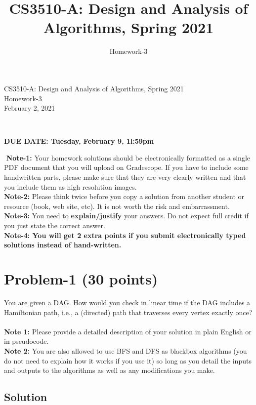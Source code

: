 \documentclass[11pt]{article}
\title{CS3510-A: Design and Analysis of Algorithms, Spring 2021}
\author{Homework-3}
\begin{document}
\begin{center}
    
    \LARGE CS3510-A: Design and Analysis of Algorithms, Spring 2021 \\ \vspace{1em} 
    \large Homework-3 \\ \vspace{0.5em}
    February 2, 2021
\end{center}
\thispagestyle{empty}
\pagestyle{empty}
​
\noindent
\begin{center}
{\bf DUE DATE: Tuesday, February 9, 1l:59pm}
\end{center}
​
\noindent
{\bf Note-1:} Your homework solutions should be electronically formatted as a single PDF document that you will upload on Gradescope. 
If you have to include some handwritten parts, please make sure that they are very clearly written and that you include them as high resolution images. \\
​
\noindent
{\bf Note-2:} Please think twice before you copy a solution from another student or resource (book, web site, etc). 
It is not worth the risk and embarrassment. \\
​
\noindent
{\bf Note-3:} You need to {\bf explain/justify} your answers. Do not expect full credit if you just state the correct answer. \\
​
\noindent
{\bf Note-4: You will get 2 extra points if you submit electronically typed solutions instead of hand-written.} 
​
\newpage
\section*{Problem-1 (30 points)}
You are given a DAG. How would you check in linear time if the DAG includes a Hamiltonian path, i.e., a (directed) path that traverses every vertex exactly once? \\ \\\textbf{Note 1:} Please provide a detailed description of your solution in plain English or in pseudocode. \\
\textbf{Note 2:} You are also allowed to use BFS and DFS as blackbox algorithms (you do not need to explain how it works if you use it) so long as you detail the inputs and outputs to the algorithms as well as any modifications you make.​


\subsection*{Solution}
\end{document}
